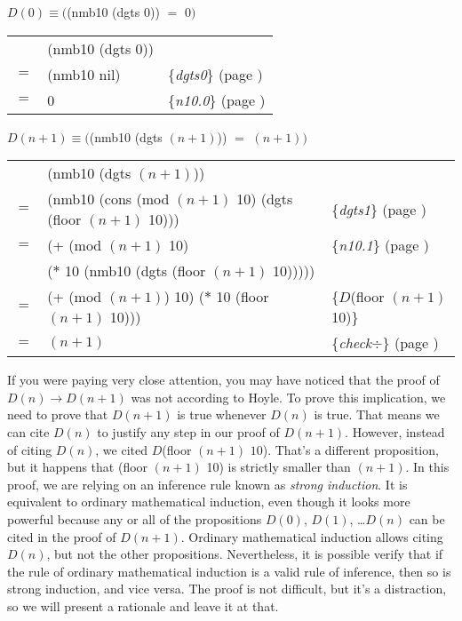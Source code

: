 \begin{center}
$D(0) \equiv ($\textsf{(nmb10 (dgts $0$))} $=$ $0)$ \\
\begin{tabular}{rll}
    \hline
    & \textsf{(nmb10 (dgts $0$))} & \\
$=$ & \textsf{(nmb10 nil)}        & \{\emph{dgts0}\} (page \pageref{dgts-defun}) \\
$=$ & \textsf{0}                  & \{\emph{n10.0}\} (page \pageref{nmb10-defun}) \\
\end{tabular}
\end{center}

\begin{center}
$D(n+1) \equiv ($\textsf{(nmb10 (dgts $(n+1)$))} $=$ $(n + 1))$ \\
\begin{tabular}{rll}
    \hline
    & \textsf{(nmb10 (dgts $(n+1)$))}           & \\
$=$ & \textsf{(nmb10 (cons (mod $(n+1)$ 10) (dgts (floor $(n+1)$ 10)))}  & \{\emph{dgts1}\} (page \pageref{dgts-defun})\\
$=$ & \textsf{(+ (mod $(n+1)$ 10)}              & \{\emph{n10.1}\} (page \pageref{nmb10-defun})\\
    & \phantom{\textsf{(+ }}\textsf{($*$ 10 (nmb10 (dgts (floor $(n+1)$ 10)))))} &\\
$=$ & \textsf{(+ (mod $(n+1)$) 10) ($*$ 10 (floor $(n+1)$ 10)))}  & \{$D$(floor $(n+1)$ 10)\} \\
$=$ & $(n+1)$  & \{\emph{check}$\div$\} (page \pageref{third-grade-division})
\end{tabular}
\end{center}

If you were paying very close attention,
you may have noticed that the proof of $D(n) \rightarrow D(n+1)$
was not according to Hoyle.
To prove this implication, we need to prove that $D(n+1)$ is true whenever $D(n)$ is true.
That means we can cite $D(n)$ to justify any step in our proof of $D(n+1)$.
However, instead of citing $D(n)$, we cited $D$\textsf{(floor $(n+1)$ $10$)}.
That's a different proposition,
but it happens that \textsf{(floor $(n+1)$ 10)} is strictly smaller than $(n+1)$.
In this proof, we are relying on an inference rule
known as \emph{strong induction}.
It is equivalent to ordinary mathematical induction,
even though it looks more powerful because any or all of the
propositions $D(0)$, $D(1)$, \dots $D(n)$ can be cited in the proof of $D(n+1)$.
Ordinary mathematical induction allows citing $D(n)$, but not the other
propositions.
Nevertheless, it is possible verify that if the rule of ordinary mathematical induction
is a valid rule of inference, then so is strong induction, and vice versa.
The proof is not difficult, but it's a distraction,
so we will present a rationale and leave it at that.

